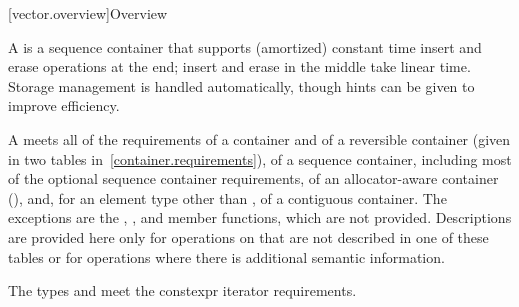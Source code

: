 [vector.overview]{Overview}

\pnum
{}%
A
is a sequence container that supports
(amortized) constant time insert and erase operations at the end;
insert and erase in the middle take linear time.
Storage management is handled automatically, though hints can be given
to improve efficiency.

\pnum
A  meets all of the requirements of a container and of a
reversible container (given in two tables in~\ref{container.requirements}), of a
sequence container, including most of the optional sequence container
requirements, of an allocator-aware container
(),
and, for an element type other than ,
of a contiguous container.
The exceptions are the
, , and  member functions, which are not
provided. Descriptions are provided here only for operations on 
that are not described in one of these tables or for operations where there is
additional semantic information.

\pnum
The types  and  meet
the constexpr iterator requirements.

